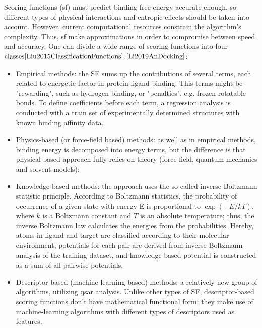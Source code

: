   Scoring functions (\acrshort{sf}) must predict binding free-energy accurate enough, 
so different types of physical interactions and entropic effects should be taken 
into account.
  However, current computational resources constrain the algorithm's complexity.
  Thus, \acrshort{sf} make approximations in order to compromise between speed and 
accuracy. One can divide a wide range of scoring functions into four $\text{classes}{\cite{Liu2015ClassificationFunctions}, 
\cite{Li2019AnDocking}}$:
  \begin{itemize}
        \item Empirical methods: the SF sums up the contributions of several terms, each related to energetic factor in protein-ligand binding.
        This terms might be "rewarding", such as hydrogen binding, or "penalties", 
e.g. frozen rotatable bonds.
        To define coefficients before each term, a regression analysis is conducted 
with a train set of experimentally determined structures with known binding affinity 
data.
       \item Physics-based (or force-field based) methods: as well as in empirical methods, binding energy is decomposed into energy terms, but the difference is that physical-based approach fully relies on theory (force field, quantum mechanics and solvent models);
      \item Knowledge-based methods: the approach uses the so-called inverse Boltzmann statistic principle.
      According to Boltzmann statistics, the probability of occurrence of a given 
state with energy E is proportional to $\exp{(-E/kT)}$, where $k$ is a Boltzmann 
constant and $T$ is an absolute temperature; thus, the inverse Boltzmann law calculates 
the energies from the probabilities.
      Hereby, atoms in ligand and target are classified according to their molecular 
environment; potentials for each pair are derived from inverse Boltzmann analysis 
of the training dataset, and knowledge-based potential is constructed as a sum of 
all pairwise potentials.
      \item Descriptor-based (machine learning-based) methods: a relatively new group of algorithms, utilizing \acrshort{qsar} analysis.
      Unlike other types of SF, descriptor-based scoring functions don't have mathematical 
functional form; they make use of machine-learning algorithms with different types 
of descriptors used as features. 
  \end{itemize}

